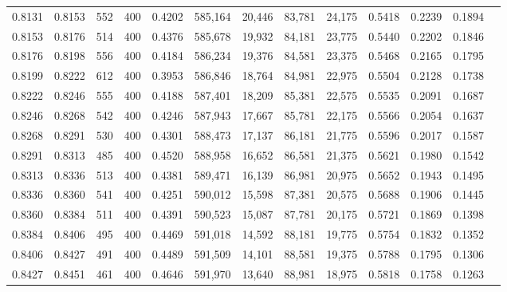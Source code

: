\begin{tabular}{rrrrrrrrrrrrr}
0.8131 & 0.8153 &    552 &   400 &                                     0.4202 & 585,164 &  20,446 &  83,781 &  24,175 & 0.5418 & 0.2239 & 0.1894 \\
0.8153 & 0.8176 &    514 &   400 &                                     0.4376 & 585,678 &  19,932 &  84,181 &  23,775 & 0.5440 & 0.2202 & 0.1846 \\
0.8176 & 0.8198 &    556 &   400 &                                     0.4184 & 586,234 &  19,376 &  84,581 &  23,375 & 0.5468 & 0.2165 & 0.1795 \\
0.8199 & 0.8222 &    612 &   400 &                                     0.3953 & 586,846 &  18,764 &  84,981 &  22,975 & 0.5504 & 0.2128 & 0.1738 \\
0.8222 & 0.8246 &    555 &   400 &                                     0.4188 & 587,401 &  18,209 &  85,381 &  22,575 & 0.5535 & 0.2091 & 0.1687 \\
0.8246 & 0.8268 &    542 &   400 &                                     0.4246 & 587,943 &  17,667 &  85,781 &  22,175 & 0.5566 & 0.2054 & 0.1637 \\
0.8268 & 0.8291 &    530 &   400 &                                     0.4301 & 588,473 &  17,137 &  86,181 &  21,775 & 0.5596 & 0.2017 & 0.1587 \\
0.8291 & 0.8313 &    485 &   400 &                                     0.4520 & 588,958 &  16,652 &  86,581 &  21,375 & 0.5621 & 0.1980 & 0.1542 \\
0.8313 & 0.8336 &    513 &   400 &                                     0.4381 & 589,471 &  16,139 &  86,981 &  20,975 & 0.5652 & 0.1943 & 0.1495 \\
0.8336 & 0.8360 &    541 &   400 &                                     0.4251 & 590,012 &  15,598 &  87,381 &  20,575 & 0.5688 & 0.1906 & 0.1445 \\
0.8360 & 0.8384 &    511 &   400 &                                     0.4391 & 590,523 &  15,087 &  87,781 &  20,175 & 0.5721 & 0.1869 & 0.1398 \\
0.8384 & 0.8406 &    495 &   400 &                                     0.4469 & 591,018 &  14,592 &  88,181 &  19,775 & 0.5754 & 0.1832 & 0.1352 \\
0.8406 & 0.8427 &    491 &   400 &                                     0.4489 & 591,509 &  14,101 &  88,581 &  19,375 & 0.5788 & 0.1795 & 0.1306 \\
0.8427 & 0.8451 &    461 &   400 &                                     0.4646 & 591,970 &  13,640 &  88,981 &  18,975 & 0.5818 & 0.1758 & 0.1263 \\

\end{tabular}
